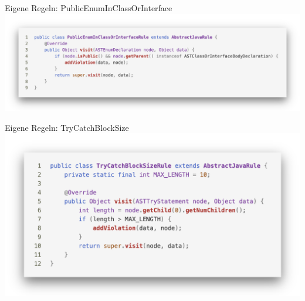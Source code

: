 \documentclass{sdqbeamer}
\begin{document}
\begin{frame}[fragile]{Eigene Regeln: PublicEnumInClassOrInterface}
    \vspace{-0.5cm}
    \hspace{-0.7cm}
    \includegraphics[scale=0.23]{logos/CustomRulePublicEnumInClassOrInterface.png}
\end{frame}

\begin{frame}[fragile]{Eigene Regeln: TryCatchBlockSize}
    \vspace{-0.5cm}
    \hspace{-0.7cm}
    \includegraphics[scale=0.24]{logos/CustomRuleTryCatch.png}
        
\end{frame}
\end{document}
